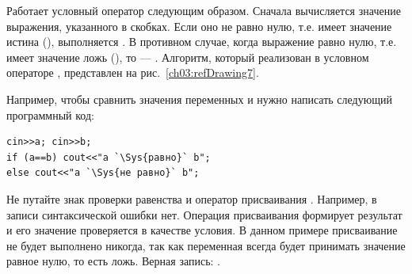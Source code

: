 Работает условный оператор следующим образом. Сначала вычисляется значение выражения, указанного в скобках. Если
оно не равно нулю, т.е. имеет значение истина (), выполняется . В
противном случае, когда выражение равно нулю, т.е. имеет значение ложь (), то ---
. Алгоритм, который реализован в условном операторе , представлен на
рис.~\ref{ch03:refDrawing7}.


Например, чтобы сравнить значения переменных  и  нужно написать следующий
программный код:
\begin{lstlisting}
cin>>a; cin>>b;
if (a==b) cout<<"a `\Sys{равно}` b";
else cout<<"a `\Sys{не равно}` b";
\end{lstlisting}

 Не путайте знак проверки равенства \Sys{==} и оператор присваивания
\Sys{=}. Например, в записи  синтаксической ошибки нет. Операция
присваивания  формирует результат и его значение проверяется в качестве условия. В данном примере
присваивание  не будет выполнено никогда, так как переменная  всегда будет
принимать значение равное нулю, то есть ложь. Верная запись: 
.

